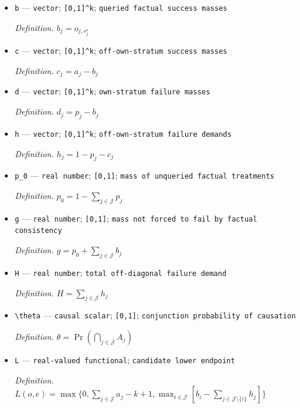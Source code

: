 \documentclass{article}
\begin{document}
\begin{itemize}
  \item \texttt{b} --- \texttt{vector}; \texttt{[0,\allowbreak{}1]\textasciicircum{}k}; \texttt{queried factual success masses}
  \par\smallskip\noindent\emph{Definition.} \(b_j=o_{j,s_j^\star}\)
  \item \texttt{c} --- \texttt{vector}; \texttt{[0,\allowbreak{}1]\textasciicircum{}k}; \texttt{off-\allowbreak{}own-\allowbreak{}stratum success masses}
  \par\smallskip\noindent\emph{Definition.} \(c_j=a_j-b_j\)
  \item \texttt{d} --- \texttt{vector}; \texttt{[0,\allowbreak{}1]\textasciicircum{}k}; \texttt{own-\allowbreak{}stratum failure masses}
  \par\smallskip\noindent\emph{Definition.} \(d_j=p_j-b_j\)
  \item \texttt{h} --- \texttt{vector}; \texttt{[0,\allowbreak{}1]\textasciicircum{}k}; \texttt{off-\allowbreak{}own-\allowbreak{}stratum failure demands}
  \par\smallskip\noindent\emph{Definition.} \(h_j=1-p_j-c_j\)
  \item \texttt{p\_\allowbreak{}0} --- \texttt{real number}; \texttt{[0,\allowbreak{}1]}; \texttt{mass of unqueried factual treatments}
  \par\smallskip\noindent\emph{Definition.} \(p_0=1-\sum_{j\in\mathcal J}p_j\)
  \item \texttt{g} --- \texttt{real number}; \texttt{[0,\allowbreak{}1]}; \texttt{mass not forced to fail by factual consistency}
  \par\smallskip\noindent\emph{Definition.} \(g=p_0+\sum_{j\in\mathcal J}b_j\)
  \item \texttt{H} --- \texttt{real number}; \texttt{total off-\allowbreak{}diagonal failure demand}
  \par\smallskip\noindent\emph{Definition.} \(H=\sum_{j\in\mathcal J}h_j\)
  \item \texttt{\textbackslash{}\allowbreak{}theta} --- \texttt{causal scalar}; \texttt{[0,\allowbreak{}1]}; \texttt{conjunction probability of causation}
  \par\smallskip\noindent\emph{Definition.} \(\theta=\Pr(\bigcap_{j\in\mathcal J}A_j)\)
  \item \texttt{L} --- \texttt{real-\allowbreak{}valued functional}; \texttt{candidate lower endpoint}
  \par\smallskip\noindent\emph{Definition.} \(L(o,e)=\max\{0,\sum_{j\in\mathcal J}a_j-k+1,\max_{i\in\mathcal J}[b_i-\sum_{j\in\mathcal J\setminus\{i\}}h_j]\}\)

\end{itemize}
\end{document}
